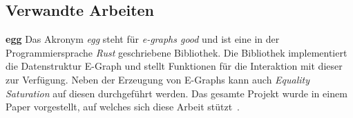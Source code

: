 
\subsection{Verwandte Arbeiten}

\noindent\textbf{egg} Das Akronym \textit{egg} steht für \textit{e-graphs good} und ist eine in der Programmiersprache \textit{Rust} geschriebene Bibliothek.
Die Bibliothek implementiert die Datenstruktur E-Graph und stellt Funktionen für die Interaktion mit dieser zur Verfügung.
Neben der Erzeugung von E-Graphs kann auch \textit{Equality Saturation} auf diesen durchgeführt werden.
Das gesamte Projekt wurde in einem Paper vorgestellt, auf welches sich diese Arbeit stützt~\cite{2021-egg}.
